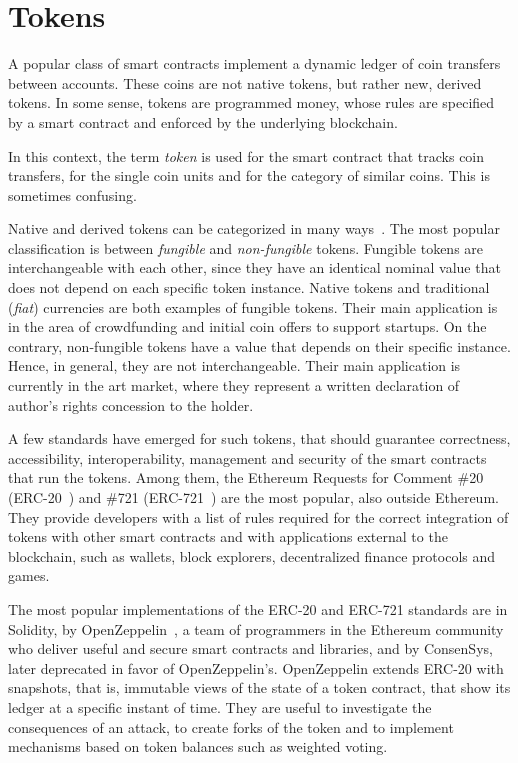 \chapter{Tokens}\label{ch:tokens}

A popular class of smart contracts
implement a dynamic ledger of coin transfers between accounts. These
coins are not native tokens, but rather new, derived tokens.
In some sense, tokens are programmed money, whose rules are specified
by a smart contract and enforced by the underlying blockchain.

\begin{commentbox}
In this context, the term \emph{token} is used
for the smart contract that tracks coin transfers, for the single coin units and for the category
of similar coins. This is sometimes confusing.
\end{commentbox}

Native and derived tokens can be categorized in many
ways~\cite{OliveiraZBS18,FreniFM20,Tapscott20}.
The most popular classification
is between \emph{fungible} and \emph{non-fungible} tokens.
Fungible tokens are interchangeable with each other, since they have an identical
nominal value that does not depend on each specific token instance.
Native tokens and traditional (\emph{fiat}) currencies are both examples of fungible tokens.
Their main application is in the area of crowdfunding and initial coin offers
to support startups.
On the contrary, non-fungible tokens have a value that depends on their specific instance.
Hence, in general, they are not interchangeable.
Their main application is currently in the art market, where they represent
a written declaration of author's rights concession to the holder.

A few standards have emerged for such tokens,
that should guarantee correctness,
accessibility, interoperability, management and security
of the smart contracts that run the tokens.
Among them, the Ethereum Requests for Comment \#20
(ERC-20~\cite{VogelstellerB15}) and \#721 (ERC-721~\cite{EntrikenSES18})
are the most popular, also outside Ethereum. They provide developers with
a list of rules required for the correct integration of tokens
with other smart contracts and with applications external to the blockchain,
such as wallets, block explorers, decentralized finance protocols and games.

The most popular implementations of the ERC-20 and ERC-721 standards are in Solidity,
by OpenZeppelin~\cite{OpenZeppelinERC20,OpenZeppelinERC721},
a team of programmers in the Ethereum community
who deliver useful and secure smart contracts and libraries, and by
ConsenSys, later deprecated in favor of OpenZeppelin's.
OpenZeppelin extends ERC-20 with snapshots, that is,
immutable views of the state of a token contract, that show
its ledger at a specific instant of time.
They are useful to investigate the consequences of an attack, to create forks of the token
and to implement mechanisms based on token balances such as weighted voting.

